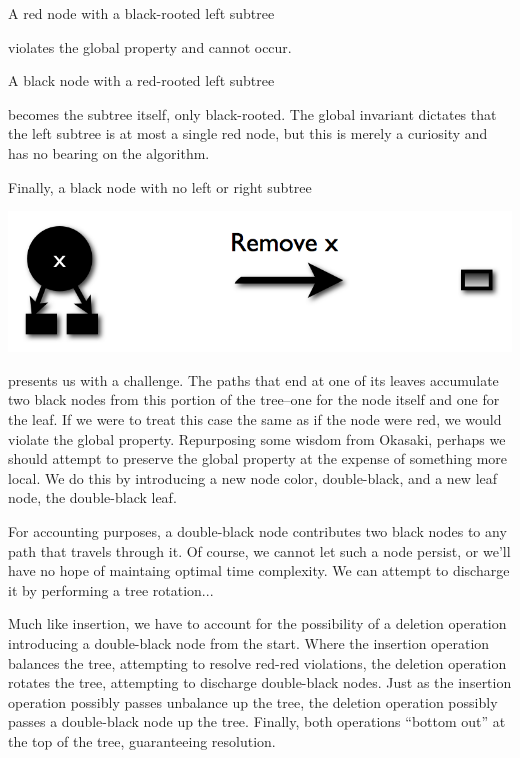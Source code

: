 \documentclass[preprint]{sigplanconf}
\begin{document}
A red node with a black-rooted left subtree


violates the global property and cannot occur.

A black node with a red-rooted left subtree


becomes the subtree itself, only black-rooted. The global invariant dictates that the left subtree is at most a single red node, but this is merely a curiosity and has no bearing on the algorithm.

Finally, a black node with no left or right subtree
\begin{center}
\includegraphics[scale=0.22]{remove-single-black.png}
\end{center}
presents us with a challenge. The paths that end at one of its leaves accumulate two black nodes from this portion of the tree--one for the node itself and one for the leaf. If we were to treat this case the same as if the node were red, we would violate the global property. Repurposing some wisdom from Okasaki, perhaps we should attempt to preserve the global property at the expense of something more local. We do this by introducing a new node color, double-black, and a new leaf node, the double-black leaf.

For accounting purposes, a double-black node contributes two black nodes to any path that travels through it. Of course, we cannot let such a node persist, or we'll have no hope of maintaing optimal time complexity. We can attempt to discharge it by performing a tree rotation...

Much like insertion, we have to account for the possibility of a deletion operation introducing a double-black node from the start. Where the insertion operation balances the tree, attempting to resolve red-red violations, the deletion operation rotates the tree, attempting to discharge double-black nodes. Just as the insertion operation possibly passes unbalance up the tree, the deletion operation possibly passes a double-black node up the tree. Finally, both operations ``bottom out'' at the top of the tree, guaranteeing resolution.
\end{document}
